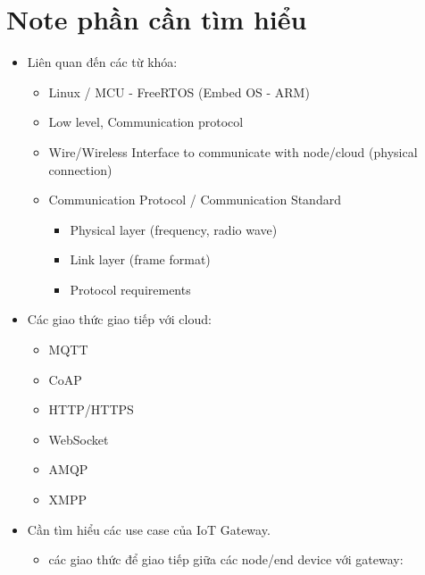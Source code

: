 \section*{Note phần cần tìm hiểu}
\begin{itemize}
    \item Liên quan đến các từ khóa:
    \begin{itemize}
        \item Linux / MCU - FreeRTOS (Embed OS - ARM)
        \item Low level, Communication protocol
        \item Wire/Wireless Interface to communicate with node/cloud (physical connection)
        \item Communication Protocol / Communication Standard
        \begin{itemize}
            \item Physical layer (frequency, radio wave)
            \item Link layer (frame format)
            \item Protocol requirements
        \end{itemize}
    \end{itemize}
    \item Các giao thức giao tiếp với cloud:
    \begin{itemize}
        \item MQTT
        \item CoAP
        \item HTTP/HTTPS
        \item WebSocket
        \item AMQP
        \item XMPP
    \end{itemize}
    \item Cần tìm hiểu các use case của IoT Gateway.
    \begin{itemize}
        \item các giao thức để giao tiếp giữa các node/end device với gateway:

\end{itemize}
\end{itemize}
